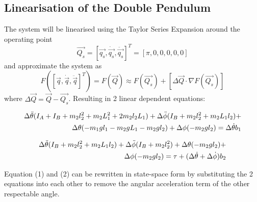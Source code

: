 \documentclass[a4paper,12pt]{article}
\begin{document}
\begin{appendices}
		\newpage
		\section{Linearisation of the Double Pendulum}
			
		The system will be linearised using the Taylor Series Expansion around the operating point $$ \vec{Q_{s}} = [\vec{q_{s}},\dot{\vec{q_{s}}},\ddot{\vec{q_{s}}}]^{T}=[\pi,0,0,0,0,0]$$ and approximate the system as $$F([\vec{q},\dot{\vec{q}},\ddot{\vec{q}} ]^{T}) = F(\vec{Q}) \approx F(\vec{Q_{s}})+[\Delta{\vec{Q}}\cdot\nabla F(\vec{Q_{s}})] $$
		where $\Delta{\vec{Q}} = \vec{Q} - \vec{Q_{s}} $. Resulting in 2 linear dependent equations:
		
		\begin{align}
		\Delta{\ddot{\theta}}(I_{A}+I_{B}+m_{2}l_{2}^2+m_{2}L_{1}^2+2m_{2}l_{2}L_{1})+\Delta{\ddot{\phi}(I_{B}+m_{2}l_{2}^2+m_{2}L_{1}l_{2})}+ \notag \\
		\Delta{\theta(-m_{1}gl_{1}-m_{2}gL_{1}-m_{2}gl_{2})}+\Delta{\phi(-m_{2}gl_{2})}=\Delta{\dot{\theta}}b_{1}
		\end{align}
		
		\begin{align}
		\Delta{\ddot{\theta}(I_{B}+m_{2}l_{2}^2+m_{2}L_{1}l_{2})}+\Delta{\ddot{\phi}(I_{B}+m_{2}l_{2}^2)}+\Delta{\theta(-m_{2}gl_{2})}+\notag \\ 
		\Delta{\phi(-m_{2}gl_{2})}=\tau + (\Delta{\dot{\theta}}+\Delta{\dot{\phi}})b_{2} 
		\end{align}
		
		Equation (1) and (2) can be rewritten in state-space form by substituting the 2 equations into each other to remove the angular acceleration term of the other respectable angle. 
		

\end{appendices}
\end{document}
